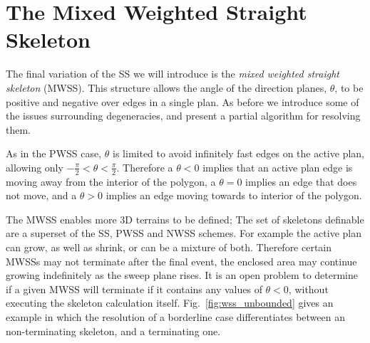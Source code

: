 
\section{The Mixed Weighted Straight Skeleton}
\label{sec:mwss}



The final variation of the SS we will introduce is the \emph{mixed weighted straight skeleton} (MWSS). This structure allows the angle of the direction planes, $\theta$, to be positive and negative over edges in a single plan. As before we introduce some of the issues surrounding degeneracies, and present a partial algorithm for resolving them.

As in the PWSS case, $\theta$ is limited to avoid infinitely fast edges on the active plan, allowing only  $-\frac{\pi}{2} < \theta < \frac{\pi}{2}$. Therefore a $\theta < 0$ implies that an active plan edge is moving away from the interior of the polygon, a $\theta = 0$ implies an edge that does not move, and a $\theta > 0$ implies an edge moving towards to interior of the polygon. 

The MWSS enables more 3D terrains to be defined; The set of skeletons definable are a superset of the SS, PWSS and NWSS schemes. For example the active plan can grow, as well as shrink, or can be a mixture of both. Therefore certain MWSSs may not terminate after the final event, the enclosed area may continue growing indefinitely as the sweep plane rises. It is an open problem to determine if a given MWSS will terminate if it contains any values of $\theta < 0$, without executing the skeleton calculation itself. Fig.~\ref{fig:wss_unbounded} gives an example in which the resolution of a borderline case differentiates between an non-terminating skeleton, and a terminating one.

